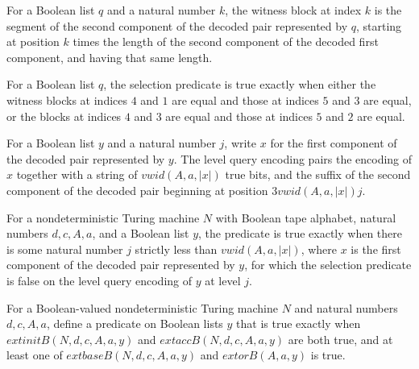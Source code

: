 \begin{definition}
\label{Complexity.TQBFHard.winBlk}
\leanok
{}
For a Boolean list $q$ and a natural number $k$, the witness block at index $k$ is the
segment of the second component of the decoded pair represented by $q$, starting at
position $k$ times the length of the second component of the decoded first component,
and having that same length.
\end{definition}

\begin{definition}
\label{Complexity.TQBFHard.selT}
\leanok
{}
For a Boolean list $q$, the selection predicate is true exactly when either the witness
blocks at indices $4$ and $1$ are equal and those at indices $5$ and $3$ are equal, or
the blocks at indices $4$ and $3$ are equal and those at indices $5$ and $2$ are equal.
\end{definition}

\begin{definition}
\label{Complexity.TQBFHard.lvlQ}
\leanok
{}
For a Boolean list $y$ and a natural number $j$, write $x$ for the first component of
the decoded pair represented by $y$. The level query encoding pairs the encoding of $x$
together with a string of $vwid(A,a,|x|)$ true bits, and the suffix of the second
component of the decoded pair beginning at position $3vwid(A,a,|x|)j$.
\end{definition}

\begin{definition}
\label{Complexity.TQBFHard.orB}
\leanok
{}
For a nondeterministic Turing machine $N$ with Boolean tape alphabet, natural numbers
$d,c,A,a$, and a Boolean list $y$, the predicate is true exactly when there is some
natural number $j$ strictly less than $vwid(A,a,|x|)$, where $x$ is the first component
of the decoded pair represented by $y$, for which the selection predicate is false on
the level query encoding of $y$ at level $j$.
\end{definition}

\begin{definition}
\label{Complexity.TQBFHard.predB}
\leanok
{}
For a Boolean-valued nondeterministic Turing machine $N$ and natural numbers $d,c,A,a$,
define a predicate on Boolean lists $y$ that is true exactly when
$	ext{initB}(N,d,c,A,a,y)$ and $	ext{accB}(N,d,c,A,a,y)$ are both true, and at least one
of $	ext{baseB}(N,d,c,A,a,y)$ and $	ext{orB}(A,a,y)$ is true.
\end{definition}

